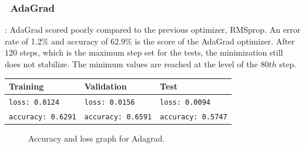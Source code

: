 \documentclass[lnbip]{svmultln}
\newcommand{\myfloatalign}{\centering}
\begin{document}
	
	\subsubsection*{\qquad \textbullet \ \textbf{AdaGrad}}:
	AdaGrad scored poorly compared to the previous optimizer, RMSprop. An error rate of 1.2\% and accuracy of 62.9\% is the score of the AdaGrad optimizer. After $120$ steps, which is the maximum step set for the tests, the minimization still does not stabilize. The minimum values are reached at the level of the $80th$ step.
	\begin{table}[H]
		\centering
		\begin{tabular}{l|l|l}
			\hline
			{\textbf{Training}} & {\textbf{Validation}} & {\textbf{Test}} \\
			\hline
			\texttt{loss: 0.0124} & \texttt{loss: 0.0156} & \texttt{loss: 0.0094} \\
			\texttt{accuracy: 0.6291} & \texttt{accuracy: 0.6591} & \texttt{accuracy: 0.5747} \\
			\hline
		\end{tabular}
	\end{table}
	\begin{figure}[H]
		\myfloatalign
		 \quad

		\caption[]{Accuracy and loss graph for Adagrad.}
	\end{figure}
	
	
\end{document}
